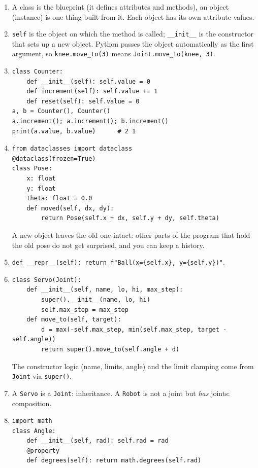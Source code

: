 \begin{enumerate}[label=\textbf{\ansnum.\arabic*}]
  \item A class is the blueprint (it defines attributes and methods), an object (instance) is one thing built from it. Each object has its own attribute values.
  \item \texttt{self} is the object on which the method is called; \texttt{\_\_init\_\_} is the constructor that sets up a new object. Python passes the object automatically as the first argument, so \verb!knee.move_to(3)! means \verb!Joint.move_to(knee, 3)!.
  \item
\begin{verbatim}
class Counter:
    def __init__(self): self.value = 0
    def increment(self): self.value += 1
    def reset(self): self.value = 0
a, b = Counter(), Counter()
a.increment(); a.increment(); b.increment()
print(a.value, b.value)      # 2 1
\end{verbatim}
  \item
\begin{verbatim}
from dataclasses import dataclass
@dataclass(frozen=True)
class Pose:
    x: float
    y: float
    theta: float = 0.0
    def moved(self, dx, dy):
        return Pose(self.x + dx, self.y + dy, self.theta)
\end{verbatim}
  A new object leaves the old one intact: other parts of the program that hold the old pose do not get surprised, and you can keep a history.
  \item \verb!def __repr__(self): return f"Ball(x={self.x}, y={self.y})"!.
  \item
\begin{verbatim}
class Servo(Joint):
    def __init__(self, name, lo, hi, max_step):
        super().__init__(name, lo, hi)
        self.max_step = max_step
    def move_to(self, target):
        d = max(-self.max_step, min(self.max_step, target - self.angle))
        return super().move_to(self.angle + d)
\end{verbatim}
  The constructor logic (name, limits, angle) and the limit clamping come from \texttt{Joint} via \texttt{super()}.
  \item A \texttt{Servo} is a \texttt{Joint}: inheritance. A \texttt{Robot} is not a joint but \emph{has} joints: composition.
  \item
\begin{verbatim}
import math
class Angle:
    def __init__(self, rad): self.rad = rad
    @property
    def degrees(self): return math.degrees(self.rad)
\end{verbatim}

\end{enumerate}
